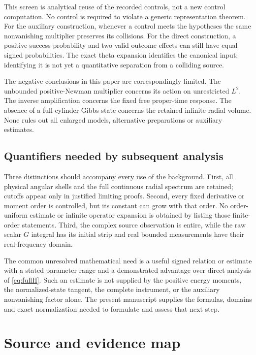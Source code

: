 This screen is analytical reuse of the recorded controls, not a new
control computation. No control is required to violate a generic
representation theorem. For the auxiliary construction, whenever a
control meets the hypotheses the same nonvanishing multiplier preserves
its collisions. For the direct construction, a positive success
probability and two valid outcome effects can still have equal signed
probabilities. The exact theta expansion identifies the canonical input;
identifying it is not yet a quantitative separation from a colliding source.

The negative conclusions in this paper are correspondingly limited.
The unbounded positive-Newman multiplier concerns its action on
unrestricted $L^2$. The inverse amplification concerns the fixed free
proper-time response. The absence of a full-cylinder Gibbs state concerns
the retained infinite radial volume. None rules out all enlarged models,
alternative preparations or auxiliary estimates.

\subsection{Quantifiers needed by subsequent analysis}
Three distinctions should accompany every use of the background.
First, all physical angular shells and the full continuous radial
spectrum are retained; cutoffs appear only in justified limiting proofs.
Second, every fixed derivative or moment order is controlled, but its
constant can grow with that order. No order-uniform estimate or infinite
operator expansion is obtained by listing those finite-order statements.
Third, the complex source observation is entire, while the raw scalar
$G$ integral has its initial strip and real bounded measurements have
their real-frequency domain.

The common unresolved mathematical need is a useful signed relation or
estimate with a stated parameter range and a demonstrated advantage over
direct analysis of \eqref{eq:fullH}. Such an estimate is not supplied by
the positive energy moments, the normalized-state tangent, the complete
instrument, or the auxiliary nonvanishing factor alone. The present
manuscript supplies the formulas, domains and exact normalization needed
to formulate and assess that next step.

\appendix
\section{Source and evidence map}\label{sec:evidence}


